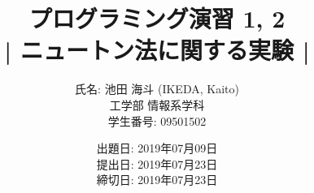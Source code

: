 \documentclass[12pt]{jarticle}
\begin{document}
\title{プログラミング演習 1, 2 \\ | ニュートン法に関する実験 |}

\date{出題日: 2019年07月09日 \\
      提出日: 2019年07月23日 \\
      締切日: 2019年07月23日 \\}

\author{氏名: 池田 海斗 (IKEDA, Kaito) \\
        工学部 情報系学科 \\
        学生番号: 09501502}

\maketitle

\end{document}
